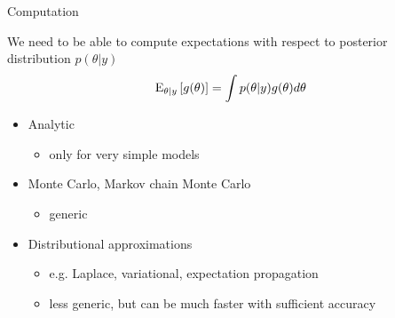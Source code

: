 \documentclass[10pt,handout]{beamer}
\begin{document}
\begin{frame}{Computation}

  We need to be able to compute expectations with respect to posterior
  distribution $p(\theta|y)$
  \begin{align*}
    \mathrm{E}_{\theta|y}\left[ g(\theta) \right] = \int p(\theta|y)g(\theta) d\theta
  \end{align*}

  \begin{itemize}
  \item Analytic
    \begin{itemize}
    \item only for very simple models
    \end{itemize}
  \item Monte Carlo, Markov chain Monte Carlo
    \begin{itemize}
    \item generic
    \end{itemize}
  \item Distributional approximations
    \begin{itemize}
    \item e.g. Laplace, variational, expectation propagation
    \item less generic, but can be much faster with sufficient accuracy
    \end{itemize}
  \end{itemize}
\end{frame}
\end{document}
